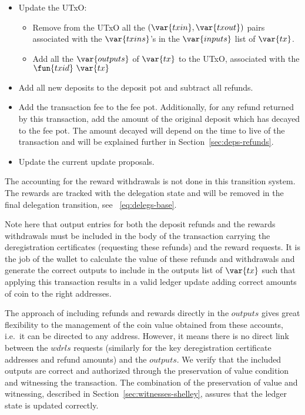 \begin{itemize}
  \item Update the UTxO:
    \begin{itemize}
      \item Remove from the UTxO all the $(\var{txin}, \var{txout})$ pairs
        associated with the $\var{txins}$'s in the $\var{inputs}$ list of $\var{tx}$.
      \item Add all the $\var{outputs}$ of $\var{tx}$ to the
        UTxO, associated with the $\fun{txid}~\var{tx}$
    \end{itemize}
  \item Add all new deposits to the deposit pot and subtract all refunds.
  \item Add the transaction fee to the fee pot. Additionally, for any refund
    returned by this transaction, add the amount of the original deposit
    which has decayed to the fee pot.
    The amount decayed will depend on the time to live of the transaction
    and will be explained further in Section~\ref{sec:deps-refunds}.
  \item Update the current update proposals.
\end{itemize}

The accounting for the reward withdrawals is not done in this transition system.
The rewards are tracked with the delegation state and will
be removed in the final delegation transition, see ~\ref{eq:delegs-base}.

Note here that output entries for both the deposit refunds and the rewards
withdrawals must be included in the body of the transaction
carrying the deregistration certificates (requesting these refunds) and the
reward requests. It is the job
of the wallet to calculate the value of these refunds and withdrawals and
generate the correct outputs to include in the outputs list of $\var{tx}$ such
that applying this transaction results in a
valid ledger update adding correct amounts of coin to the right addresses.

The approach of including refunds and rewards directly in the $outputs$ gives
great flexibility to the management of the coin value obtained from these
accounts, i.e.~it can be directed to any address. However, it means there is no
direct link between the $wdrls$ requests (similarly for the key deregistration
certificate addresses and refund amounts) and the $outputs$. We verify that
the included outputs are correct and authorized through the preservation of value condition
and witnessing the transaction. The combination of the
preservation of value and witnessing, described in Section~\ref{sec:witnesses-shelley},
assures that the ledger state is updated correctly.

